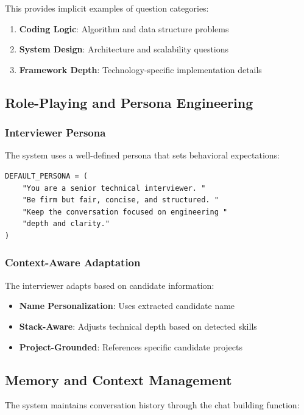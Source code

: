 \documentclass[12pt,a4paper]{article}
\begin{document}
This provides implicit examples of question categories:
\begin{enumerate}
    \item \textbf{Coding Logic}: Algorithm and data structure problems
    \item \textbf{System Design}: Architecture and scalability questions
    \item \textbf{Framework Depth}: Technology-specific implementation details
\end{enumerate}

\subsection{Role-Playing and Persona Engineering}

\subsubsection{Interviewer Persona}
The system uses a well-defined persona that sets behavioral expectations:

\begin{lstlisting}[caption=Persona Definition]
DEFAULT_PERSONA = (
    "You are a senior technical interviewer. "
    "Be firm but fair, concise, and structured. "
    "Keep the conversation focused on engineering "
    "depth and clarity."
)
\end{lstlisting}

\subsubsection{Context-Aware Adaptation}
The interviewer adapts based on candidate information:

\begin{itemize}
    \item \textbf{Name Personalization}: Uses extracted candidate name
    \item \textbf{Stack-Aware}: Adjusts technical depth based on detected skills
    \item \textbf{Project-Grounded}: References specific candidate projects
\end{itemize}

\subsection{Memory and Context Management}

The system maintains conversation history through the chat building function:
\end{document}
